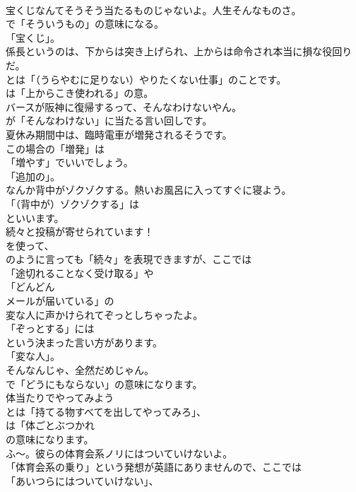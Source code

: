 \documentclass[8pt]{extreport}
\begin{document}
\begin{CJK}{UTF8}{min}
\\	宝くじなんてそうそう当たるものじゃないよ。人生そんなものさ。 
\\	で「そういうもの」の意味になる。
\\	「宝くじ」。	
\\	係長というのは、下からは突き上げられ、上からは命令され本当に損な役回りだ。 
\\	とは「（うらやむに足りない）やりたくない仕事」のことです。
\\	は「上からこき使われる」の意。	
\\	バースが阪神に復帰するって、そんなわけないやん。 
\\	が「そんなわけない」に当たる言い回しです。	
\\	夏休み期間中は、臨時電車が増発されるそうです。 
\\	この場合の「増発」は
\\	「増やす」でいいでしょう。
\\	「追加の」。	
\\	なんか背中がゾクゾクする。熱いお風呂に入ってすぐに寝よう。 
\\	「（背中が）ゾクゾクする」は
\\	といいます。	
\\	続々と投稿が寄せられています！ 
\\	を使って、
\\	のように言っても「続々」を表現できますが、ここでは
\\	「途切れることなく受け取る」や
\\	「どんどん
\\	メールが届いている」の	
\\	変な人に声かけられてぞっとしちゃったよ。 
\\	「ぞっとする」には
\\	という決まった言い方があります。
\\	「変な人」。	
\\	そんなんじゃ、全然だめじゃん。 
\\	で「どうにもならない」の意味になります。	
\\	体当たりでやってみよう 
\\	とは「持てる物すべてを出してやってみろ」、
\\	は「体ごとぶつかれ
\\	の意味になります。	
\\	ふ～。彼らの体育会系ノリにはついていけないよ。 
\\	「体育会系の乗り」という発想が英語にありませんので、ここでは
\\	「あいつらにはついていけない」、

\end{CJK}
\end{document}
